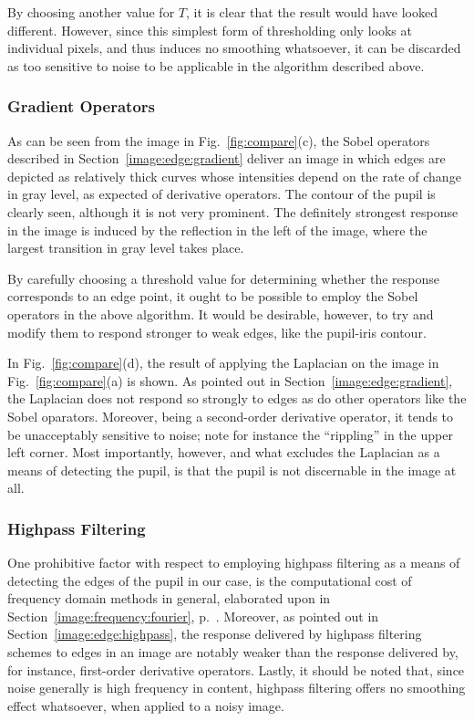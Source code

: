 By choosing another value for $T$, it is clear that the result would
have looked different.  However, since this simplest form of
thresholding only looks at individual pixels, and thus induces no
smoothing whatsoever, it can be discarded as too sensitive to noise to
be applicable in the algorithm described above.

\subsubsection{Gradient Operators}

As can be seen from the image in Fig.~\ref{fig:compare}(c), the Sobel
operators described in Section~\ref{image:edge:gradient} deliver an
image in which edges are depicted as relatively thick curves whose
intensities depend on the rate of change in gray level, as expected of
derivative operators.  The contour of the pupil is clearly seen,
although it is not very prominent.  The definitely strongest response
in the image is induced by the reflection in the left of the image,
where the largest transition in gray level takes place.

By carefully choosing a threshold value for determining whether the
response corresponds to an edge point, it ought to be possible to
employ the Sobel operators in the above algorithm.  It would be
desirable, however, to try and modify them to respond stronger to weak
edges, like the pupil-iris contour.

In Fig.~\ref{fig:compare}(d), the result of applying the Laplacian on
the image in Fig.~\ref{fig:compare}(a) is shown.  As pointed out in
Section~\ref{image:edge:gradient}, the Laplacian does not respond so
strongly to edges as do other operators like the Sobel oparators.
Moreover, being a second-order derivative operator, it tends to be
unacceptably sensitive to noise; note for instance the ``rippling'' in
the upper left corner.  Most importantly, however, and what excludes
the Laplacian as a means of detecting the pupil, is that the pupil is
not discernable in the image at all.

\subsubsection{Highpass Filtering}

One prohibitive factor with respect to employing highpass filtering as
a means of detecting the edges of the pupil in our case, is the
computational cost of frequency domain methods in general, elaborated
upon in Section~\ref{image:frequency:fourier}, p.~\pageref{pg:fft:O}.
Moreover, as pointed out in Section~\ref{image:edge:highpass}, the
response delivered by highpass filtering schemes to edges in an image
are notably weaker than the response delivered by, for instance,
first-order derivative operators.  Lastly, it should be noted that,
since noise generally is high frequency in content, highpass filtering
offers no smoothing effect whatsoever, when applied to a noisy image.

